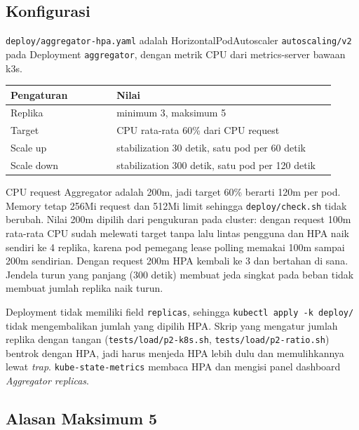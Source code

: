 \subsection{Konfigurasi}

\texttt{deploy/aggregator-hpa.yaml} adalah HorizontalPodAutoscaler \texttt{autoscaling/v2} pada Deployment \texttt{aggregator}, dengan metrik CPU dari metrics-server bawaan k3s.

\begin{longtable}[]{|>{\raggedright\arraybackslash}p{0.3\linewidth}|>{\raggedright\arraybackslash}p{0.62\linewidth}|}
\hline
\textbf{Pengaturan} & \textbf{Nilai} \\
\hline
\endfirsthead
\hline
\endhead
Replika & minimum 3, maksimum 5 \\
\hline
Target & CPU rata-rata 60\% dari CPU request \\
\hline
Scale up & stabilization 30 detik, satu pod per 60 detik \\
\hline
Scale down & stabilization 300 detik, satu pod per 120 detik \\
\hline
\end{longtable}

CPU request Aggregator adalah 200m, jadi target 60\% berarti 120m per pod. Memory tetap 256Mi request dan 512Mi limit sehingga \texttt{deploy/check.sh} tidak berubah. Nilai 200m dipilih dari pengukuran pada cluster: dengan request 100m rata-rata CPU sudah melewati target tanpa lalu lintas pengguna dan HPA naik sendiri ke 4 replika, karena pod pemegang lease polling memakai 100m sampai 200m sendirian. Dengan request 200m HPA kembali ke 3 dan bertahan di sana. Jendela turun yang panjang (300 detik) membuat jeda singkat pada beban tidak membuat jumlah replika naik turun.

Deployment tidak memiliki field \texttt{replicas}, sehingga \texttt{kubectl apply -k deploy/} tidak mengembalikan jumlah yang dipilih HPA. Skrip yang mengatur jumlah replika dengan tangan (\texttt{tests/load/p2-k8s.sh}, \texttt{tests/load/p2-ratio.sh}) bentrok dengan HPA, jadi harus menjeda HPA lebih dulu dan memulihkannya lewat \textit{trap}. \texttt{kube-state-metrics} membaca HPA dan mengisi panel dashboard \textit{Aggregator replicas}.

\subsection{Alasan Maksimum 5}


